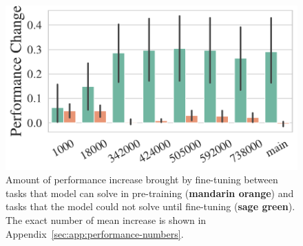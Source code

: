 \begin{figure}[t]
    \centering
  \includegraphics[width=0.84\columnwidth]{figures/fig_files/ptft_comparison_bar.pdf}
  \caption{Amount of performance increase brought by fine-tuning between tasks that model can solve in pre-training (\textcolor{snslightorange}{\textbf{mandarin orange}}) and tasks that the model could not solve until fine-tuning (\textcolor{snsgreen}{\textbf{sage green}}). The exact number of mean increase is shown in Appendix~\ref{sec:app:performance-numbers}.}
  \label{fig:finding:ptftcompare}
\end{figure}
